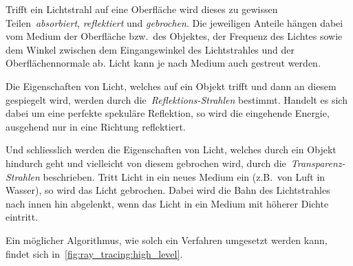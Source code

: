Trifft ein Lichtstrahl auf eine Oberfläche wird dieses zu gewissen
Teilen~\textit{absorbiert}, \textit{reflektiert} und \textit{gebrochen}.
Die jeweiligen Anteile hängen dabei vom Medium der Oberfläche bzw.\ des
Objektes, der Frequenz des Lichtes sowie dem Winkel zwischen dem
Eingangswinkel des Lichtstrahles und der Oberflächennormale ab. Licht
kann je nach Medium auch gestreut werden.

Die Eigenschaften von Licht, welches auf ein Objekt trifft und dann an
diesem gespiegelt wird, werden durch die~\textit{Reflektions-Strahlen}
bestimmt. Handelt es sich dabei um eine perfekte spekuläre Reflektion,
so wird die eingehende Energie, ausgehend nur in eine Richtung
reflektiert.

Und schliesslich werden die Eigenschaften von Licht, welches durch ein
Objekt hindurch geht und vielleicht von diesem gebrochen wird, durch
die~\textit{Transparenz-Strahlen} beschrieben. Tritt Licht in ein neues
Medium ein (z.B.\ von Luft in Wasser), so wird das Licht gebrochen.
Dabei wird die Bahn des Lichtstrahles nach innen hin abgelenkt, wenn das
Licht in ein Medium mit höherer Dichte eintritt.

Ein möglicher Algorithmus, wie solch ein Verfahren umgesetzt werden kann,
findet sich in~\ref{fig:ray_tracing:high_level}.

